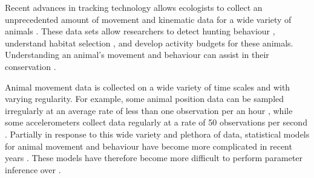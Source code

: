 
Recent advances in tracking technology allows ecologists to collect an unprecedented amount of movement and kinematic data for a wide variety of animals \citep{Patterson:2017}. These data sets allow researchers to detect hunting behaviour \citep{Heerah:2017}, understand habitat selection \citep{Michelot:2019b}, and develop activity budgets \citep{Dot:2016} for these animals. Understanding an animal's movement and behaviour can assist in their conservation \citep{Sutherland:1998}.

Animal movement data is collected on a wide variety of time scales and with varying regularity. For example, some animal position data can be sampled irregularly at an average rate of less than one observation per an hour \citep{Gryba:2019}, while some accelerometers collect data regularly at a rate of 50 observations per second \citep{Daneault:2021}. Partially in response to this wide variety and plethora of data, statistical models for animal movement and behaviour have become more complicated in recent years \citep{Hooten:2017}. These models have therefore become more difficult to perform parameter inference over \citep{McClintock:2012,Michelot:2019b}.

